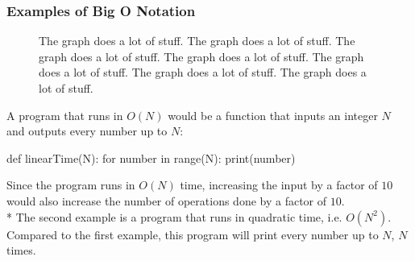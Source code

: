\documentclass[main.tex]{subfiles}
\begin{document}
\subsubsection{Examples of Big O Notation}


\begin{figure}[h]
    \begin{center}
    \end{center}
\caption{The graph does a lot of stuff. The graph does a lot of stuff. The graph does a lot of stuff. The graph does a lot of stuff. The graph does a lot of stuff. The graph does a lot of stuff. The graph does a lot of stuff.}
\end{figure}

\vspace{10mm}

A program that runs in $O(N)$ would be a function that inputs an integer $N$ and outputs every number up to $N$:
\begin{python}
def linearTime(N):
    for number in range(N):
        print(number)
\end{python}

Since the program runs in $O(N)$ time, increasing the input by a factor of $10$ would also increase the number of operations done by a factor of $10$.
\newline
\\*
The second example is a program that runs in quadratic time, i.e. $O(N^{2})$. Compared to the first example, this program will print every number up to $N$, $N$ times.
\end{document}
